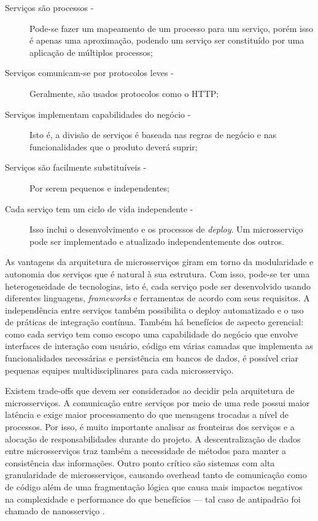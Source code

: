 \begin{description}
\item[Serviços são processos -]Pode-se fazer um mapeamento de um processo para um serviço, porém isso é apenas uma aproximação, podendo um serviço ser constituído por uma aplicação de múltiplos processos;
\item[Serviços comunicam-se por protocolos leves -]Geralmente, são usados protocolos como o HTTP;
\item[Serviços implementam capabilidades do negócio -]Isto é, a divisão de serviços é baseada nas regras de negócio e nas funcionalidades que o produto deverá suprir;
\item[Serviços são facilmente substituíveis - ]Por serem pequenos e independentes;
\item[Cada serviço tem um ciclo de vida independente -]Isso inclui o desenvolvimento e os processos de \emph{deploy}. Um microsserviço pode ser implementado e atualizado independentemente dos outros.
\end{description}

As vantagens da arquitetura de microsserviços giram em torno da modularidade e autonomia dos serviços que é natural à sua estrutura. Com isso, pode-se ter uma heterogeneidade de tecnologias, isto é, cada serviço pode ser desenvolvido usando diferentes linguagens, \textit{frameworks} e ferramentas de acordo com seus requisitos. A independência entre serviços também possibilita o deploy automatizado e o uso de práticas de integração contínua. Também há benefícios de aspecto gerencial: como cada serviço tem como escopo uma capabilidade do negócio que envolve interfaces de interação com usuário, código em várias camadas que implementa as funcionalidades necessárias e persistência em bancos de dados, é possível criar pequenas equipes multidisciplinares para cada microsserviço.

Existem trade-offs que devem ser considerados ao decidir pela arquitetura de microsserviços. A comunicação entre serviços por meio de uma rede possui maior latência e exige maior processamento do que mensagens trocadas a nível de processos. Por isso, é muito importante analisar as fronteiras dos serviços e a alocação de responsabilidades durante do projeto. A descentralização de dados entre microsserviços traz também a necessidade de métodos para manter a consistência das informações. Outro ponto crítico são sistemas com alta granularidade de microsserviços, causando overhead tanto de comunicação como de código além de uma fragmentação lógica que causa mais impactos negativos na complexidade e performance do que benefícios --- tal caso de antipadrão foi chamado de nanosserviço \cite{rotem}.

